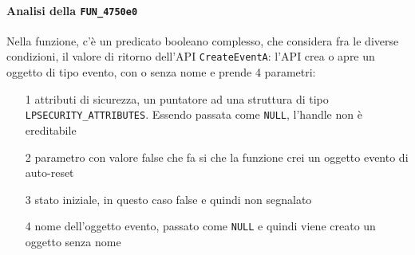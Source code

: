 \documentclass[12pt]{extarticle}
\begin{document}
\paragraph{Analisi della \texttt{FUN\_4750e0}} Nella funzione, c'è un predicato booleano complesso, che considera fra le diverse condizioni, il valore di ritorno dell'API \texttt{CreateEventA}: l'API crea o apre un oggetto di tipo evento, con o senza nome e prende 4 parametri:
\begin{itemize}
    \item[1] attributi di sicurezza, un puntatore ad una struttura di tipo \texttt{LPSECURITY\_ATTRIBUTES}. Essendo passata come \texttt{NULL}, l'handle non è ereditabile
    \item[2] parametro con valore false che fa si che la funzione crei un oggetto evento di auto-reset
    \item[3] stato iniziale, in questo caso false e quindi non segnalato
    \item[4] nome dell'oggetto evento, passato come \texttt{NULL} e quindi viene creato un oggetto senza nome
\end{itemize}
\end{document}
